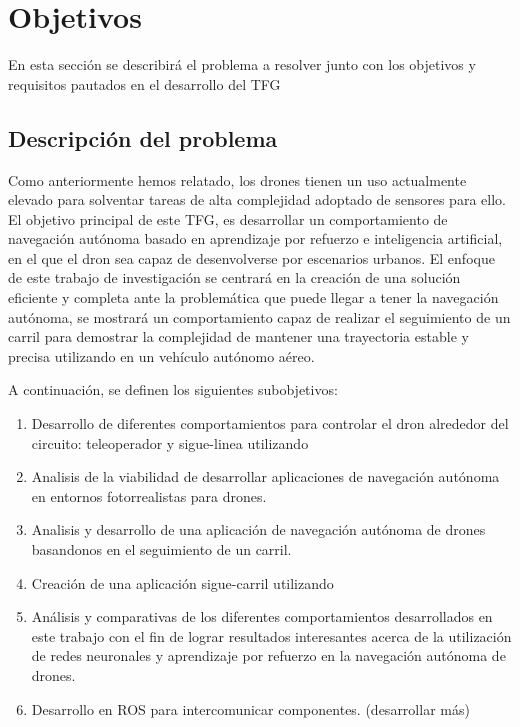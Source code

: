 \chapter{Objetivos}
\label{cap:capitulo2}


En esta sección se describirá el problema a resolver junto con los objetivos y requisitos pautados en el desarrollo del TFG


\section{Descripción del problema}
\label{sec:descripcion}

Como anteriormente hemos relatado, los drones tienen un uso actualmente elevado para solventar tareas de alta complejidad adoptado de sensores 
para ello. El objetivo principal de este TFG, es desarrollar un comportamiento de navegación autónoma basado en aprendizaje por refuerzo e 
inteligencia artificial, en el que el dron sea capaz de desenvolverse por escenarios urbanos. El enfoque de este trabajo de investigación 
se centrará en la creación de una solución eficiente y completa ante la problemática que puede llegar a tener la navegación autónoma, se 
mostrará un comportamiento capaz de realizar el seguimiento de un carril para demostrar la complejidad de mantener una trayectoria estable 
y precisa utilizando en un vehículo autónomo aéreo. 

A continuación, se definen los siguientes subobjetivos: 

\begin{enumerate}
    \item Desarrollo de diferentes comportamientos para controlar el dron alrededor del circuito: teleoperador y sigue-linea utilizando
    \item Analisis de la viabilidad de desarrollar aplicaciones de navegación autónoma en entornos fotorrealistas para drones.
    \item Analisis y desarrollo de una aplicación de navegación autónoma de drones basandonos en el seguimiento de un carril.
    \item Creación de una aplicación sigue-carril utilizando 
    \item Análisis y comparativas de los diferentes comportamientos desarrollados en este trabajo con el fin de 
    lograr resultados interesantes acerca de la utilización de redes neuronales y aprendizaje por refuerzo en la navegación autónoma de drones.
    \item Desarrollo en ROS para intercomunicar componentes. (desarrollar más)
\end{enumerate}
\newpage
